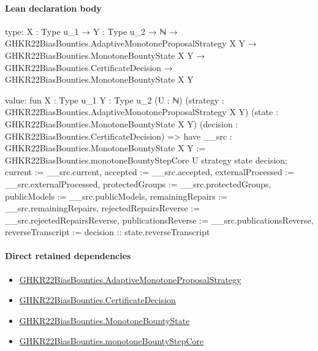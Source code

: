 \documentclass[10pt]{article}
\begin{document}
\paragraph{Lean declaration body}
\begin{ReviewVerbatim}
type:
{X : Type u_1} →
  {Y : Type u_2} →
    ℕ →
      GHKR22BiasBounties.AdaptiveMonotoneProposalStrategy X Y →
        GHKR22BiasBounties.MonotoneBountyState X Y →
          GHKR22BiasBounties.CertificateDecision → GHKR22BiasBounties.MonotoneBountyState X Y

value:
fun {X : Type u_1} {Y : Type u_2} (U : ℕ) (strategy : GHKR22BiasBounties.AdaptiveMonotoneProposalStrategy X Y)
    (state : GHKR22BiasBounties.MonotoneBountyState X Y) (decision : GHKR22BiasBounties.CertificateDecision) =>
  have __src : GHKR22BiasBounties.MonotoneBountyState X Y :=
    GHKR22BiasBounties.monotoneBountyStepCore U strategy state decision;
  { current := __src.current, accepted := __src.accepted, externalProcessed := __src.externalProcessed,
    protectedGroups := __src.protectedGroups, publicModels := __src.publicModels,
    remainingRepairs := __src.remainingRepairs, rejectedRepairsReverse := __src.rejectedRepairsReverse,
    publicationsReverse := __src.publicationsReverse, reverseTranscript := decision :: state.reverseTranscript }
\end{ReviewVerbatim}

\paragraph{Direct retained dependencies}
\begin{itemize}\raggedright
\item \hyperlink{governing-declaration-975ce4ec5f91862b}{GHKR22\allowbreak{}Bias\allowbreak{}Bounties.\allowbreak{}Adaptive\allowbreak{}Monotone\allowbreak{}Proposal\allowbreak{}Strategy}
\item \hyperlink{governing-declaration-7881732e3fc3c15e}{GHKR22\allowbreak{}Bias\allowbreak{}Bounties.\allowbreak{}Certificate\allowbreak{}Decision}
\item \hyperlink{governing-declaration-95acf4a72cd8625a}{GHKR22\allowbreak{}Bias\allowbreak{}Bounties.\allowbreak{}Monotone\allowbreak{}Bounty\allowbreak{}State}
\item \hyperlink{governing-declaration-863b1d0a8403d56e}{GHKR22\allowbreak{}Bias\allowbreak{}Bounties.\allowbreak{}monotone\allowbreak{}Bounty\allowbreak{}Step\allowbreak{}Core}
\end{itemize}
\hypertarget{governing-declaration-b6ddc0a8e26f01ab}{}
\end{document}
